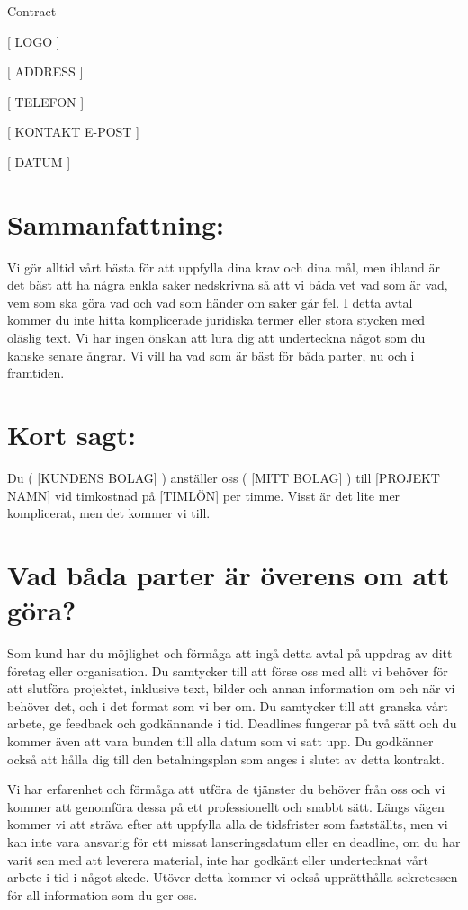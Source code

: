 \documentclass[10pt,a4paper,parskip]{scrartcl}
\begin{document}
\begin{center} {\Large Contract} \end{center}

[ LOGO ]

[ ADDRESS ]

[ TELEFON ]

[ KONTAKT E-POST ]

[ DATUM ]

\section{Sammanfattning:}

Vi gör alltid vårt bästa för att uppfylla dina krav och dina mål,
men ibland är det bäst att ha några enkla saker nedskrivna så att vi båda vet
vad som är vad, vem som ska göra vad och vad som händer om saker går fel. I
detta avtal kommer du inte hitta komplicerade juridiska termer eller stora
stycken med oläslig text. Vi har ingen önskan att lura dig att underteckna
något som du kanske senare ångrar. Vi vill ha vad som är bäst för båda parter,
nu och i framtiden.

\section{Kort sagt:}

Du ( [KUNDENS BOLAG] ) anställer oss ( [MITT BOLAG] ) till [PROJEKT NAMN] vid
timkostnad på [TIMLÖN] per timme. Visst är det lite mer komplicerat, men det
kommer vi till.

\section{Vad båda parter är överens om att göra?}

Som kund har du möjlighet och förmåga att ingå detta avtal på uppdrag av ditt
företag eller organisation. Du samtycker till att förse oss med allt vi
behöver för att slutföra projektet, inklusive text, bilder och annan
information om och när vi behöver det, och i det format som vi ber om. Du
samtycker till att granska vårt arbete, ge feedback och godkännande i tid.
Deadlines fungerar på två sätt och du kommer även att vara bunden till alla
datum som vi satt upp. Du godkänner också att hålla dig till den betalningsplan
som anges i slutet av detta kontrakt.

Vi har erfarenhet och förmåga att utföra de tjänster du behöver från oss och vi
kommer att genomföra dessa på ett professionellt och snabbt sätt. Längs vägen
kommer vi att sträva efter att uppfylla alla de tidsfrister som fastställts,
men vi kan inte vara ansvarig för ett missat lanseringsdatum eller en deadline,
om du har varit sen med att leverera material, inte har godkänt eller
undertecknat vårt arbete i tid i något skede. Utöver detta kommer vi också
upprätthålla sekretessen för all information som du ger oss.
\end{document}
